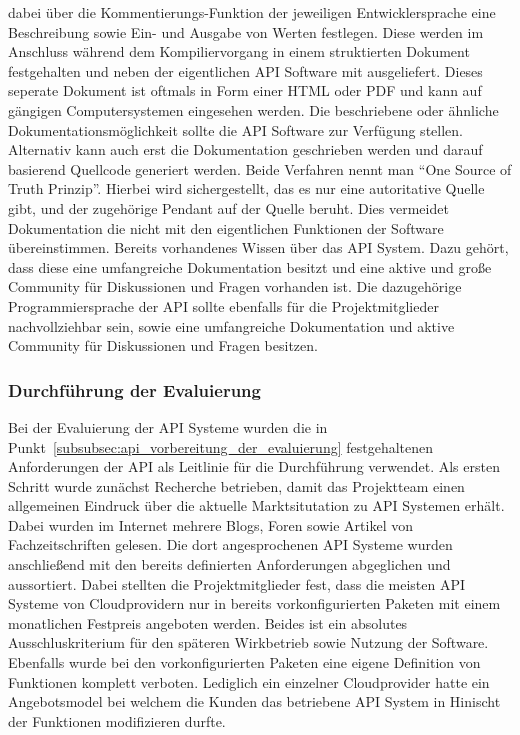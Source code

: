 \begin{outline}
  dabei über die Kommentierungs-Funktion der jeweiligen Entwicklersprache eine
  Beschreibung sowie Ein- und Ausgabe von Werten festlegen. Diese werden im
  Anschluss während dem Kompiliervorgang in einem struktierten Dokument
  festgehalten und neben der eigentlichen API Software mit ausgeliefert. Dieses
  seperate Dokument ist oftmals in Form einer HTML oder PDF und kann auf
  gängigen Computersystemen eingesehen werden. Die beschriebene oder ähnliche
  Dokumentationsmöglichkeit sollte die API Software zur Verfügung stellen.
  Alternativ kann auch erst die Dokumentation geschrieben werden und darauf
  basierend Quellcode generiert werden. Beide Verfahren nennt man ``One Source
  of Truth Prinzip''. Hierbei wird sichergestellt, das es nur eine autoritative
  Quelle gibt, und der zugehörige Pendant auf der Quelle beruht. Dies vermeidet
  Dokumentation die nicht mit den eigentlichen Funktionen der Software
  übereinstimmen.
  \1 Bereits vorhandenes Wissen über das API System. Dazu gehört, dass diese
  eine umfangreiche Dokumentation besitzt und eine aktive und große Community
  für Diskussionen und Fragen vorhanden ist. Die dazugehörige
  Programmiersprache der API sollte ebenfalls für die Projektmitglieder
  nachvollziehbar sein, sowie eine umfangreiche Dokumentation und aktive
  Community für Diskussionen und Fragen besitzen.
\end{outline}
\nl%

\subsubsection{Durchführung der Evaluierung}
\label{subsubsec:api_durchfuehrung_der_evaluierung}
Bei der Evaluierung der API Systeme wurden die in
Punkt~\ref{subsubsec:api_vorbereitung_der_evaluierung} festgehaltenen
Anforderungen der API als Leitlinie für die Durchführung verwendet. Als ersten
Schritt wurde zunächst Recherche betrieben, damit das Projektteam einen
allgemeinen Eindruck über die aktuelle Marktsitutation zu API Systemen erhält.
Dabei wurden im Internet mehrere Blogs, Foren sowie Artikel von
Fachzeitschriften gelesen.  Die dort angesprochenen API Systeme wurden
anschließend mit den bereits definierten Anforderungen abgeglichen und
aussortiert. Dabei stellten die Projektmitglieder fest, dass die meisten API
Systeme von Cloudprovidern nur in bereits vorkonfigurierten Paketen mit einem
monatlichen Festpreis angeboten werden.  Beides ist ein absolutes
Ausschluskriterium für den späteren Wirkbetrieb sowie Nutzung der Software.
Ebenfalls wurde bei den vorkonfigurierten Paketen eine eigene Definition von
Funktionen komplett verboten. Lediglich ein einzelner Cloudprovider hatte ein
Angebotsmodel bei welchem die Kunden das betriebene API System in Hinischt der
Funktionen modifizieren durfte.

